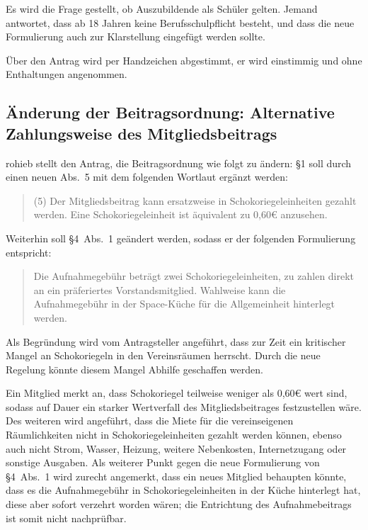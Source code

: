 \documentclass[a4paper,12pt]{scrartcl}
\begin{document}
Es wird die Frage gestellt, ob Auszubildende als Schüler gelten. Jemand
antwortet, dass ab 18 Jahren keine Berufsschulpflicht besteht, und dass die neue
Formulierung auch zur Klarstellung eingefügt werden sollte.

Über den Antrag wird per Handzeichen abgestimmt, er wird einstimmig und ohne
Enthaltungen angenommen.

\subsection{Änderung der Beitragsordnung: Alternative Zahlungsweise des
Mitgliedsbeitrags}

rohieb stellt den Antrag, die Beitragsordnung wie folgt zu ändern: §1 soll
durch einen neuen Abs.~5 mit dem folgenden Wortlaut ergänzt werden:
\begin{quote}
  (5) Der Mitgliedsbeitrag kann ersatzweise in Schokoriegeleinheiten gezahlt
  werden. Eine Schokoriegeleinheit ist äquivalent zu 0,60€ anzusehen.
\end{quote}
Weiterhin soll §4~Abs.~1 geändert werden, sodass er der folgenden Formulierung
entspricht:
\begin{quote}
  Die Aufnahmegebühr beträgt zwei Schokoriegeleinheiten, zu zahlen direkt an ein
  präferiertes Vorstandsmitglied. Wahlweise kann die Aufnahmegebühr in der
  Space-Küche für die Allgemeinheit hinterlegt werden.
\end{quote}

Als Begründung wird vom Antragsteller angeführt, dass zur Zeit ein kritischer
Mangel an Schokoriegeln in den Vereinsräumen herrscht. Durch die neue Regelung
könnte diesem Mangel Abhilfe geschaffen werden.

Ein Mitglied merkt an, dass Schokoriegel teilweise weniger als 0,60€ wert sind,
sodass auf Dauer ein starker Wertverfall des Mitgliedsbeitrages festzustellen
wäre. Des weiteren wird angeführt, dass die Miete für die vereinseigenen
Räumlichkeiten nicht in Schokoriegeleinheiten gezahlt werden können, ebenso auch
nicht Strom, Wasser, Heizung, weitere Nebenkosten, Internetzugang oder sonstige
Ausgaben. Als weiterer Punkt gegen die neue Formulierung von §4~Abs.~1 wird
zurecht angemerkt, dass ein neues Mitglied behaupten könnte, dass es die
Aufnahmegebühr in Schokoriegeleinheiten in der Küche hinterlegt hat, diese aber
sofort verzehrt worden wären; die Entrichtung des Aufnahmebeitrags ist somit
nicht nachprüfbar.
\end{document}
